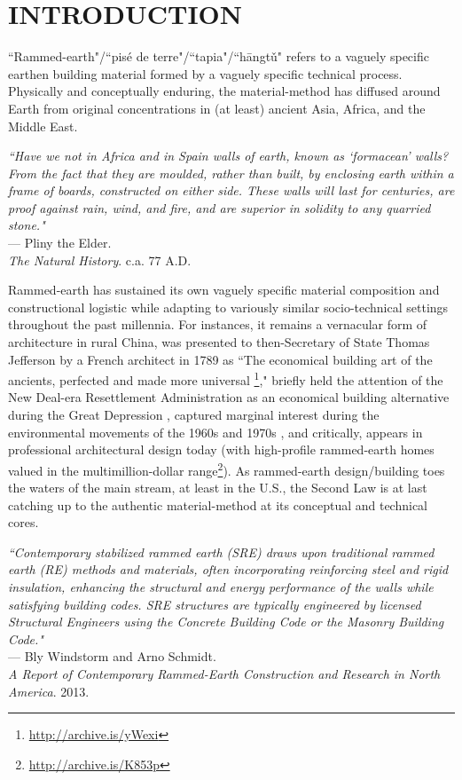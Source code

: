\section{INTRODUCTION}


``Rammed-earth"/``pis\'e de terre"/``tapia"/``h\=angt\v u" refers to a vaguely specific earthen building material formed by a vaguely specific technical process. Physically and conceptually enduring, the material-method has diffused around Earth from original concentrations in (at least) ancient Asia, Africa, and the Middle East. \cite{RAMMEDEARTHHOUSE}

\begin{flushright}
\small{
\textit{``Have we not in Africa and in Spain walls of earth, known as `formacean' walls? From the fact that they are moulded, rather than built, by enclosing earth within a frame of boards, constructed on either side. These walls will last for centuries, are proof against rain, wind, and fire, and are superior in solidity to any quarried stone."}}\\ --- Pliny the Elder. \\ \textit{The Natural History}. c.a. 77 A.D.
\end{flushright}

Rammed-earth has sustained its own vaguely specific material composition and constructional logistic while adapting to variously similar socio-technical settings throughout the past millennia. For instances, it remains a vernacular form of architecture in rural China, was presented to then-Secretary of State Thomas Jefferson by a French architect in 1789 as ``The economical building art of the ancients, perfected and made more universal \footnote{\url{http://archive.is/yWexi}}," briefly held the attention of the New Deal-era Resettlement Administration as an economical building alternative during the Great Depression \cite{GARDENDALE}, captured marginal interest during the environmental movements of the 1960s and 1970s \cite{GARDENDALE}, and critically, appears in professional architectural design today (with high-profile rammed-earth homes valued in the multimillion-dollar range\footnote{\url{http://archive.is/K853p}}). As rammed-earth design/building toes the waters of the main stream, at least in the U.S., the Second Law is at last catching up to the authentic material-method at its conceptual and technical cores.

\begin{flushright}
\small{
\textit{
``Contemporary stabilized rammed earth (SRE) draws upon traditional rammed earth (RE) methods and materials, often incorporating reinforcing steel and rigid insulation, enhancing the structural and energy performance of the walls while satisfying building codes. SRE structures are typically engineered by licensed Structural Engineers using the Concrete Building Code or the Masonry Building Code."}} \\ --- Bly Windstorm and Arno Schmidt. \\ \textit{A Report of Contemporary Rammed-Earth Construction and Research in North America}. 2013.
\end{flushright}

